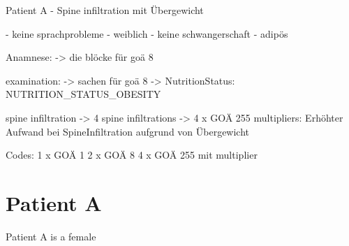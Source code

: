 
Patient A - Spine infiltration mit Übergewicht

- keine sprachprobleme
- weiblich
- keine schwangerschaft
- adipös

Anamnese:
-> die blöcke für goä 8

examination:
-> sachen für goä 8
-> NutritionStatus: NUTRITION_STATUS_OBESITY

spine infiltration
-> 4 spine infiltrations -> 4 x GOÄ 255
multipliers:
Erhöhter Aufwand bei SpineInfiltration aufgrund von Übergewicht

Codes:
1 x GOÄ 1
2 x GOÄ 8
4 x GOÄ 255 mit multiplier

\section{Patient A}

Patient A is a female

